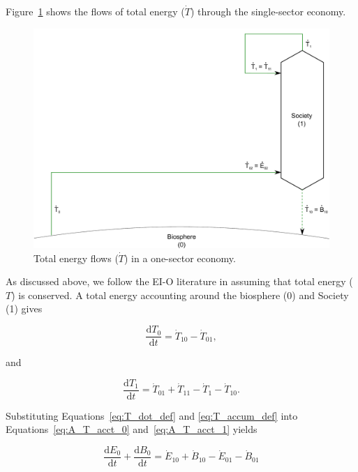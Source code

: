 Figure~\ref{fig:A_total_energy_T_dot} shows the flows 
of total energy ($\dot{T}$) through the single-sector economy.

\begin{figure}[!ht]
\includegraphics[width=1.0\linewidth]{Part_1/Chapter_Embodied/images/1_sector_embodied_energy.pdf}
\caption[Total energy flows in a one-sector economy]{Total energy flows ($\dot{T}$) in a one-sector economy.}
\label{fig:A_total_energy_T_dot}
\end{figure}

As discussed above, we follow the EI-O literature in assuming that 
total energy ($T$) is conserved. 
A total energy accounting around the biosphere (0)
and Society (1) gives

\begin{equation} \label{eq:A_T_acct_0}
	\frac{\mathrm{d}T_{0}}{\mathrm{d}t} 
	= \dot{T}_{10} 
	- \dot{T}_{01},
\end{equation}

\noindent and

\begin{equation} \label{eq:A_T_acct_1}
	\frac{\mathrm{d}T_{1}}{\mathrm{d}t} 
	= \dot{T}_{01} 
	+ \dot{T}_{11}
	- \dot{T}_{1}
	- \dot{T}_{10}.
\end{equation}

Substituting Equations~\ref{eq:T_dot_def} and
\ref{eq:T_accum_def} into 
Equations~\ref{eq:A_T_acct_0} and~\ref{eq:A_T_acct_1}
yields

\begin{equation} \label{eq:A_total_energy_0}
	\frac{\mathrm{d}E_{0}}{\mathrm{d}t} 
	+ \frac{\mathrm{d}B_{0}}{\mathrm{d}t} 
	= \dot{E}_{10} 
	+ \dot{B}_{10} 
	- \dot{E}_{01}
	- \dot{B}_{01}
\end{equation}

